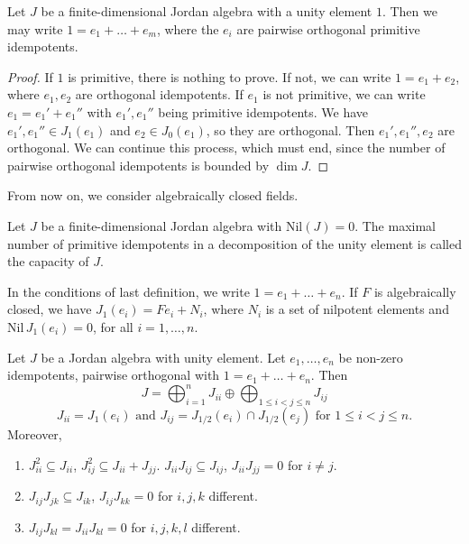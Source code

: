 \documentclass{article}
\begin{document}
\begin{lemma}  
Let $J$ be a finite-dimensional Jordan algebra with a unity element $1$. Then we may write $1 = e_1 + \dots + e_m$, where the $e_i$ are pairwise orthogonal primitive idempotents.  
\end{lemma}  

\begin{proof}  
If $1$ is primitive, there is nothing to prove. If not, we can write $1 = e_1 + e_2$, where $e_1, e_2$ are orthogonal idempotents. If $e_1$ is not primitive, we can write $e_1 = e_1' + e_1''$ with $e_1', e_1''$ being primitive idempotents. We have $e_1', e_1'' \in J_1(e_1)$ and $e_2 \in J_0(e_1)$, so they are orthogonal. Then $e_1', e_1'', e_2$ are orthogonal. We can continue this process, which must end, since the number of pairwise orthogonal idempotents is bounded by $\dim J$.  
\end{proof}  

From now on, we consider algebraically closed fields.  

\begin{definition}  
Let $J$ be a finite-dimensional Jordan algebra with $\mathrm{Nil}(J)=0$. The maximal number of primitive idempotents in a decomposition of the unity element is called the capacity of $J$.  
\end{definition}  

In the conditions of last definition, we write $1=e_1+\dots+e_n$. If $F$ is algebraically closed, we have $J_1(e_i) = Fe_i + N_i$, where $N_i$ is a set of nilpotent elements and $\mathrm{Nil}\,J_1(e_i) = 0$, for all $i=1,\dots,n$.  

\begin{definition} 
Let $J$ be a Jordan algebra with unity element.  
Let $e_1, \dots, e_n$ be non-zero idempotents, pairwise orthogonal with $1=e_1+\dots+e_n$.  
Then  
\[ J = \bigoplus_{i=1}^n J_{ii} \oplus \bigoplus_{1 \le i < j \le n} J_{ij} \]  
\[ J_{ii} = J_1(e_i) \text{ and } J_{ij} = J_{1/2}(e_i) \cap J_{1/2}(e_j) \text{ for } 1 \le i < j \le n. \]  
Moreover,  
\begin{enumerate}  
    \item[i] $J_{ii}^2 \subseteq J_{ii}$, $J_{ij}^2 \subseteq J_{ii} + J_{jj}$. $J_{ii}J_{ij} \subseteq J_{ij}$, $J_{ii}J_{jj} = 0$ for $i \ne j$.  
    \item[ii] $J_{ij}J_{jk} \subseteq J_{ik}$, $J_{ij}J_{kk} =0$ for $i,j,k$ different. 
    \item[iii] $J_{ij}J_{kl} = J_{ii}J_{kl} = 0$ for $i,j,k,l$ different.  
\end{enumerate}  
\end{definition}
\end{document}
